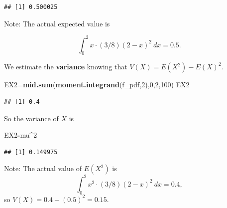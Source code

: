 \documentclass[
]{book}
\newenvironment{Shaded}{\begin{snugshade}}{\end{snugshade}}
\newcommand{\DecValTok}[1]{\textcolor[rgb]{0.00,0.00,0.81}{#1}}
\newcommand{\FunctionTok}[1]{\textcolor[rgb]{0.13,0.29,0.53}{\textbf{#1}}}
\newcommand{\NormalTok}[1]{#1}
\newcommand{\OtherTok}[1]{\textcolor[rgb]{0.56,0.35,0.01}{#1}}
\newcommand{\SpecialCharTok}[1]{\textcolor[rgb]{0.81,0.36,0.00}{\textbf{#1}}}
\theoremstyle{definition}
\theoremstyle{definition}
\theoremstyle{definition}
\theoremstyle{definition}
\theoremstyle{remark}
\begin{document}
\begin{verbatim}
## [1] 0.500025
\end{verbatim}

Note: The actual expected value is

\[\int_0^2 x \cdot (3/8)(2-x)^2~dx = 0.5.\]

We estimate the \textbf{variance} knowing that \(V(X) = E(X^2)-E(X)^2.\)

\begin{Shaded}
\begin{Highlighting}[]
\NormalTok{EX2}\OtherTok{=}\FunctionTok{mid.sum}\NormalTok{(}\FunctionTok{moment.integrand}\NormalTok{(f\_pdf,}\DecValTok{2}\NormalTok{),}\DecValTok{0}\NormalTok{,}\DecValTok{2}\NormalTok{,}\DecValTok{100}\NormalTok{)}
\NormalTok{EX2}
\end{Highlighting}
\end{Shaded}

\begin{verbatim}
## [1] 0.4
\end{verbatim}

So the variance of \(X\) is

\begin{Shaded}
\begin{Highlighting}[]
\NormalTok{EX2}\SpecialCharTok{{-}}\NormalTok{mu}\SpecialCharTok{\^{}}\DecValTok{2}
\end{Highlighting}
\end{Shaded}

\begin{verbatim}
## [1] 0.149975
\end{verbatim}

Note: The actual value of \(E(X^2)\) is \[\int_0^2 x^2 \cdot (3/8)(2-x)^2~dx = 0.4,\]
so \(V(X) = 0.4 - (0.5)^2 = 0.15.\)

  

\printindex
\end{document}
